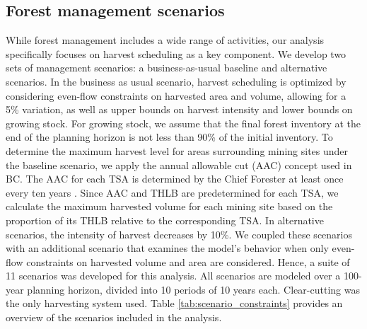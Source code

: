 \documentclass[preprint,12pt]{elsarticle}
\begin{document}
\subsection{Forest management scenarios}
\label{sec: Developed scenarios}
While forest management includes a wide range of activities, our analysis specifically focuses on harvest scheduling as a key component. We develop two sets of management scenarios: a business-as-usual baseline and alternative scenarios. In the business as usual scenario, harvest scheduling is optimized by considering even-flow constraints on harvested area and volume, allowing for a 5\% variation, as well as upper bounds on harvest intensity and lower bounds on growing stock. For growing stock, we assume that the final forest inventory at the end of the planning horizon is not less than 90\% of the initial inventory. To determine the maximum harvest level for areas surrounding mining sites under the baseline scenario, we apply the annual allowable cut (AAC) concept used in BC. The AAC for each TSA is determined by the Chief Forester at least once every ten years \citep{BCForestApportionment}. Since AAC and THLB are predetermined for each TSA, we calculate the maximum harvested volume for each mining site based on the proportion of its THLB relative to the corresponding TSA. In alternative scenarios, the intensity of harvest decreases by 10\%. We coupled these scenarios with an additional scenario that examines the model's behavior when only even-flow constraints on harvested volume and area are considered. Hence, a suite of 11 scenarios was developed for this analysis. All scenarios are modeled over a 100-year planning horizon, divided into 10 periods of 10 years each. Clear-cutting was the only harvesting system used. Table \ref{tab:scenario_constraints} provides an overview of the scenarios included in the analysis.
\end{document}
